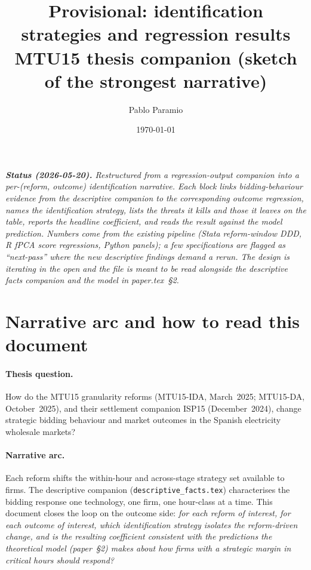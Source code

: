 \documentclass[11pt,a4paper]{article}
\title{Provisional: identification strategies and regression results\\[3pt]\large MTU15 thesis companion (sketch of the strongest narrative)}
\author{Pablo Paramio}
\date{\today}
\newcommand{\code}[1]{\nolinkurl{#1}}
\begin{document}
\maketitle

\noindent\emph{\textbf{Status (2026-05-20).} Restructured from a regression-output companion into a per-(reform, outcome) identification narrative. Each block links bidding-behaviour evidence from the descriptive companion to the corresponding outcome regression, names the identification strategy, lists the threats it kills and those it leaves on the table, reports the headline coefficient, and reads the result against the model prediction. Numbers come from the existing pipeline (Stata reform-window DDD, R fPCA score regressions, Python panels); a few specifications are flagged as ``next-pass'' where the new descriptive findings demand a rerun. The design is iterating in the open and the file is meant to be read alongside the descriptive facts companion and the model in paper.tex~\S2.}

\tableofcontents

\bigskip

\section{Narrative arc and how to read this document}\label{sec:ident:arc}

\paragraph{Thesis question.} How do the MTU15 granularity reforms (MTU15-IDA, March~2025; MTU15-DA, October~2025), and their settlement companion ISP15 (December~2024), change strategic bidding behaviour and market outcomes in the Spanish electricity wholesale markets?

\paragraph{Narrative arc.} Each reform shifts the within-hour and across-stage strategy set available to firms. The descriptive companion (\code{descriptive_facts.tex}) characterises the bidding response one technology, one firm, one hour-class at a time. This document closes the loop on the outcome side: \emph{for each reform of interest, for each outcome of interest, which identification strategy isolates the reform-driven change, and is the resulting coefficient consistent with the predictions the theoretical model (paper~\S2) makes about how firms with a strategic margin in critical hours should respond?}
\end{document}
